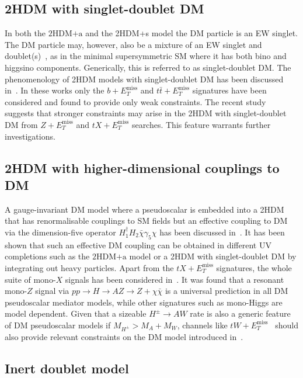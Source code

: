 \documentclass[a4paper, 11pt,notoc]{article}
\newcommand{\MET}{\ensuremath{E_T^\mathrm{miss}}\xspace}
\newcommand{\hdma}{\ensuremath{\textrm{2HDM+a}}\xspace}
\begin{document}
\subsection*{2HDM with singlet-doublet DM}

In both the \hdma and the 2HDM+s model the DM particle is  an EW singlet. The DM particle may, however, also be a mixture of an EW singlet and doublet(s)~\cite{Mahbubani:2005pt,Enberg:2007rp,Cohen:2011ec,Cheung:2013dua}, as in the minimal supersymmetric SM where it has both bino and higgsino components. Generically, this is referred to as singlet-doublet DM. The phenomenology of 2HDM models with singlet-doublet DM has been discussed in~\cite{Berlin:2015wwa,Arcadi:2018pfo}. In these works only the $b+\MET$ and $t \bar t+\MET$ signatures have been considered and found to provide only weak constraints. The recent study~\cite{Bauer:2017fsw} suggests that stronger constraints may  arise in the 2HDM with singlet-doublet DM from $Z + \MET$ and $tX+\MET$ searches. This feature warrants further investigations. 

\subsection*{2HDM with  higher-dimensional couplings to DM}

A gauge-invariant DM model where a pseudoscalar is embedded into a 2HDM that has renormalisable couplings to SM fields but an effective coupling to DM via the dimension-five operator $H_1^\dagger H_2 \bar \chi \gamma_5 \chi$ has been  discussed in~\cite{Bauer:2017fsw}. It has been shown that  such an  effective DM coupling can be obtained in different UV completions such as the \hdma model or  a 2HDM with singlet-doublet DM by integrating out heavy particles. Apart from the $t X+\MET$ signatures, the whole suite of mono-$X$ signals has been considered in~\cite{Bauer:2017fsw}. It was found that a resonant mono-$Z$ signal via $pp \to H \to AZ \to  Z + \chi \bar \chi$ is a universal prediction in all DM pseudoscalar mediator models, while other signatures such as mono-Higgs are model dependent. Given that a sizeable $H^\pm \to A W$ rate is also a generic feature of DM pseudoscalar models if $M_{H^\pm} > M_A + M_W$, channels like $tW+\MET$~\cite{Pani:2017qyd} should also  provide relevant constraints on the DM model introduced in~\cite{Bauer:2017fsw}. 

\subsection*{Inert doublet model}
\end{document}
